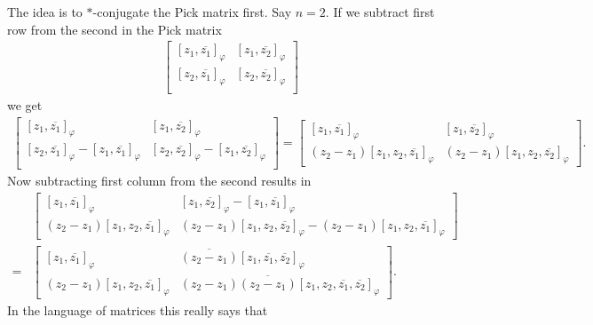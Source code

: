 The idea is to $*$-conjugate the Pick matrix first. Say $n = 2$. If we subtract first row from the second in the Pick matrix
\begin{align*}
\begin{bmatrix}
	[z_{1}, \overline{z_{1}}]_{\varphi} & [z_{1}, \overline{z_{2}}]_{\varphi}\\
	[z_{2}, \overline{z_{1}}]_{\varphi} & [z_{2}, \overline{z_{2}}]_{\varphi}\\
\end{bmatrix}
\end{align*}
we get
\begin{align*}
\begin{bmatrix}
	[z_{1}, \overline{z_{1}}]_{\varphi} & [z_{1}, \overline{z_{2}}]_{\varphi}\\
	[z_{2}, \overline{z_{1}}]_{\varphi} - [z_{1}, \overline{z_{1}}]_{\varphi} & [z_{2}, \overline{z_{2}}]_{\varphi} - [z_{1}, \overline{z_{2}}]_{\varphi}\\
\end{bmatrix}
=
\begin{bmatrix}
	[z_{1}, \overline{z_{1}}]_{\varphi} & [z_{1}, \overline{z_{2}}]_{\varphi}\\
	(z_{2} - z_{1})[z_{1}, z_{2}, \overline{z_{1}}]_{\varphi} & (z_{2} - z_{1})[z_{1}, z_{2}, \overline{z_{2}}]_{\varphi}
\end{bmatrix}.
\end{align*}
Now subtracting first column from the second results in
\begin{align*}
&\begin{bmatrix}
	[z_{1}, \overline{z_{1}}]_{\varphi} & [z_{1}, \overline{z_{2}}]_{\varphi} - [z_{1}, \overline{z_{1}}]_{\varphi}\\
	(z_{2} - z_{1})[z_{1}, z_{2}, \overline{z_{1}}]_{\varphi} & (z_{2} - z_{1})[z_{1}, z_{2}, \overline{z_{2}}]_{\varphi} - (z_{2} - z_{1})[z_{1}, z_{2}, \overline{z_{1}}]_{\varphi}
\end{bmatrix} \\
=&
\begin{bmatrix}
	[z_{1}, \overline{z_{1}}]_{\varphi} & \overline{(z_{2} - z_{1})}[z_{1}, \overline{z_{1}}, \overline{z_{2}}]_{\varphi}\\
	(z_{2} - z_{1})[z_{1}, z_{2}, \overline{z_{1}}]_{\varphi} & (z_{2} - z_{1}) \overline{(z_{2} - z_{1})}[z_{1}, z_{2}, \overline{z_{1}}, \overline{z_{2}}]_{\varphi}
\end{bmatrix}.
\end{align*}
In the language of matrices this really says that
